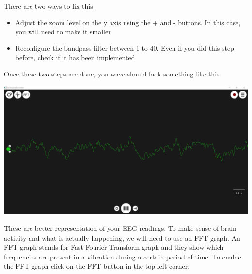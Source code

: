\documentclass[
  letterpaper,
  DIV=11,
  numbers=noendperiod]{scrreprt}
\begin{document}
There are two ways to fix this.

\begin{itemize}
\item
  Adjust the zoom level on the y axis using the + and - buttons. In this
  case, you will need to make it smaller
\item
  Reconfigure the bandpass filter between 1 to 40. Even if you did this
  step before, check if it has been implemented
\end{itemize}

Once these two steps are done, you wave should look something like this:

\includegraphics{images/clipboard-1600982436.png}

These are better representation of your EEG readings. To make sense of
brain activity and what is actually happening, we will need to use an
FFT graph. An FFT graph stands for Fast Fourier Transform graph and they
show which frequencies are present in a vibration during a certain
period of time. To enable the FFT graph click on the FFT button in the
top left corner.
\end{document}
